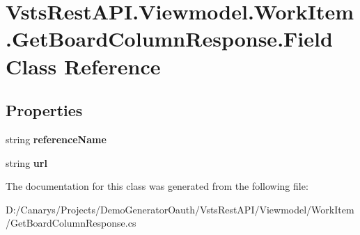 \hypertarget{class_vsts_rest_a_p_i_1_1_viewmodel_1_1_work_item_1_1_get_board_column_response_1_1_field}{}\section{Vsts\+Rest\+A\+P\+I.\+Viewmodel.\+Work\+Item.\+Get\+Board\+Column\+Response.\+Field Class Reference}
\label{class_vsts_rest_a_p_i_1_1_viewmodel_1_1_work_item_1_1_get_board_column_response_1_1_field}
\subsection*{Properties}
\begin{DoxyCompactItemize}
\item 
\mbox{\label{class_vsts_rest_a_p_i_1_1_viewmodel_1_1_work_item_1_1_get_board_column_response_1_1_field_ad1f39e5825d8c585e28639de786b29ab}} 
string {\bfseries reference\+Name}
\item 
\mbox{\label{class_vsts_rest_a_p_i_1_1_viewmodel_1_1_work_item_1_1_get_board_column_response_1_1_field_ac44319a9f92f784e3b6e0aa1f63ceff7}} 
string {\bfseries url}
\end{DoxyCompactItemize}


The documentation for this class was generated from the following file\+:\begin{DoxyCompactItemize}
\item 
D\+:/\+Canarys/\+Projects/\+Demo\+Generator\+Oauth/\+Vsts\+Rest\+A\+P\+I/\+Viewmodel/\+Work\+Item/Get\+Board\+Column\+Response.\+cs\end{DoxyCompactItemize}
